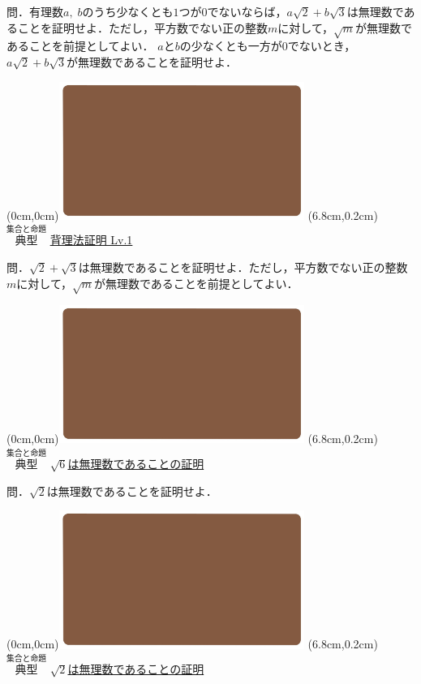 \documentclass[10pt,
fleqn,
dvipdfmx,
uplatex
]{jsarticle}
\begin{document}
\small 
問．有理数$a,\;b$のうち少なくとも$1$つが$0$でないならば，$a\sqrt 2+b\sqrt 3$は無理数であることを証明せよ．ただし，平方数でない正の整数$m$に対して，$\sqrt m$が無理数であることを前提としてよい．
$a$と$b$の少なくとも一方が$0$でないとき，$a\sqrt 2+b\sqrt 3$が無理数であることを証明せよ．


\newpage



\at(0cm,0cm){\includegraphics[width=8cm,bb=0 0 1920 1080]{./youtube/thumbnails/templates/smart_background/集合と命題.jpeg}}
\at(6.8cm,0.2cm){\small\color{bradorange}$\overset{\text{集合と命題}}{\text{典型}}$}
{\color{orange}\LARGE\underline{背理法証明 Lv.1 }}\vspace{0.3zw}

\Large 
問．$\sqrt 2+\sqrt 3$は無理数であることを証明せよ．ただし，平方数でない正の整数$m$に対して，$\sqrt m$が無理数であることを前提としてよい．


\newpage



\at(0cm,0cm){\includegraphics[width=8cm,bb=0 0 1920 1080]{./youtube/thumbnails/templates/smart_background/集合と命題.jpeg}}
\at(6.8cm,0.2cm){\small\color{bradorange}$\overset{\text{集合と命題}}{\text{典型}}$}
{\color{orange}\Large\underline{$\sqrt 6$は無理数であることの証明}}\vspace{0.3zw}

\huge 
問．$\sqrt 2$は無理数であることを証明せよ．


\newpage



\at(0cm,0cm){\includegraphics[width=8cm,bb=0 0 1920 1080]{./youtube/thumbnails/templates/smart_background/集合と命題.jpeg}}
\at(6.8cm,0.2cm){\small\color{bradorange}$\overset{\text{集合と命題}}{\text{典型}}$}
{\color{orange}\Large\underline{$\sqrt 2$は無理数であることの証明}}\vspace{0.3zw}
\end{document}
